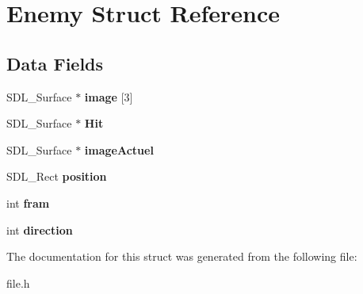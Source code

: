 \hypertarget{structEnemy}{}\section{Enemy Struct Reference}
\label{structEnemy}
\subsection*{Data Fields}
\begin{DoxyCompactItemize}
\item 
\mbox{\label{structEnemy_afc1cf868e4b6602d2166ee9cfbf1d06e}} 
S\+D\+L\+\_\+\+Surface $\ast$ {\bfseries image} \mbox{[}3\mbox{]}
\item 
\mbox{\label{structEnemy_a62ed00c1aa4ac7bb90cb132c6c56b21d}} 
S\+D\+L\+\_\+\+Surface $\ast$ {\bfseries Hit}
\item 
\mbox{\label{structEnemy_ab8d7f9eceeef8f17331210f3f1fd2cf3}} 
S\+D\+L\+\_\+\+Surface $\ast$ {\bfseries image\+Actuel}
\item 
\mbox{\label{structEnemy_ac364f2ddf130c8622889deca0b6ba4d0}} 
S\+D\+L\+\_\+\+Rect {\bfseries position}
\item 
\mbox{\label{structEnemy_a192ae3acb8bf84c4ecb81bf4864fc648}} 
int {\bfseries fram}
\item 
\mbox{\label{structEnemy_a1de1605c4b41f74c3b0f4023258323ab}} 
int {\bfseries direction}
\end{DoxyCompactItemize}


The documentation for this struct was generated from the following file\+:\begin{DoxyCompactItemize}
\item 
file.\+h\end{DoxyCompactItemize}
